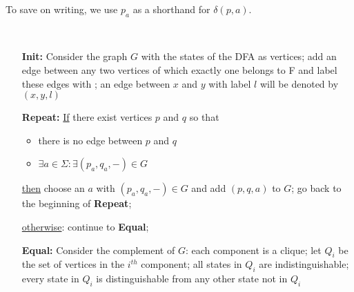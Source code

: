 To save on writing, we use $p_a$ as a shorthand for $\delta(p,a)$.


\begin{code}~ \label{gelijketoestanden}
\begin{enumerate}
\item[{\bf Init:}]
Consider the graph $G$ with the states of the DFA as vertices; add an
edge between any two vertices of which exactly one belongs to F and
label these edges with \eps; an edge between $x$ and $y$ with label
$l$ will be denoted by $(x,y,l)$


\item[{\bf Repeat:}]
\underline{If} there exist vertices $p$ and $q$ so that
\begin{itemize}
\item there is no edge between $p$ and $q$
\item $\exists a \in \Sigma: \exists (p_a,q_a,-) \in G$
\end{itemize}
\underline{then} choose an $a$ with $(p_a,q_a,-) \in G$
and add $(p,q,a)$ to $G$; go back to the beginning of \textbf{Repeat};

\underline{otherwise}: continue to \textbf{Equal};

\item[{\bf Equal:}]
Consider the complement of $G$: each component is a clique; let $Q_i$
be the set of vertices in the $i^{th}$ component; all states in $Q_i$
are indistinguishable; every state in $Q_i$ is distinguishable from
any other state not in $Q_i$

\end{enumerate}

\end{code}
